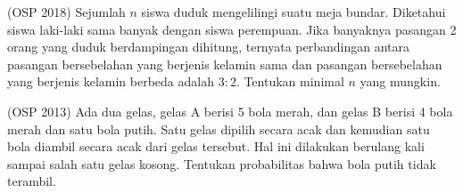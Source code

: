 \documentclass[12pt]{scrartcl}
\begin{document}
	\begin{soalbaru}
	(OSP 2018) Sejumlah $n$ siswa duduk mengelilingi suatu meja bundar. Diketahui siswa laki-laki sama banyak dengan siswa perempuan. Jika banyaknya pasangan 2 orang yang duduk berdampingan
	dihitung, ternyata perbandingan antara pasangan bersebelahan yang berjenis kelamin sama dan
	pasangan bersebelahan yang berjenis kelamin berbeda adalah $3 : 2$. Tentukan minimal $n$ yang
	mungkin.
	\end{soalbaru}
	
	\begin{soalbaru}
	(OSP 2013) Ada dua gelas, gelas A berisi 5 bola merah, dan gelas B berisi 4 bola merah dan satu
	bola putih. Satu gelas dipilih secara acak dan kemudian satu bola diambil secara acak dari gelas
	tersebut. Hal ini dilakukan berulang kali sampai salah satu gelas kosong. Tentukan probabilitas
	bahwa bola putih tidak terambil.
	\end{soalbaru} 
\end{document}
